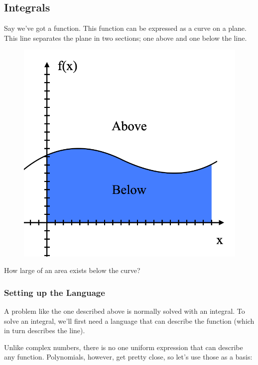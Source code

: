 


\subsection{Integrals}\label{sec:integrals}
Say we've got a function. This function can be expressed as a curve on a plane. This line separates the plane in two sections; one above and one below the line.

\begin{figure}[h!]
    \centering
    \includegraphics[scale= 0.3]{Images/integralGraph.png}
    \caption{}
    \label{integralgraph}
\end{figure}

How large of an area exists below the curve?

\subsubsection{Setting up the Language}
A problem like the one described above is normally solved with an integral. To solve an integral, we'll first need a language that can describe the function (which in turn describes the line).

Unlike complex numbers, there is no one uniform expression that can describe any function. Polynomials, however, get pretty close, so let's use those as a basis:

